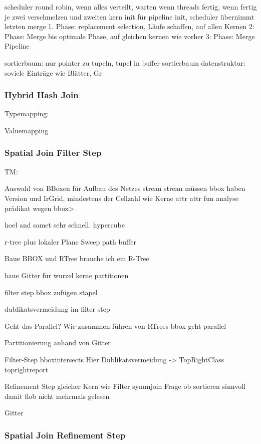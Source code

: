 \documentclass[a4paper,12pt,twoside]{article}
\begin{document}
scheduler round robin, wenn alles verteilt, warten wenn threads fertig, wenn fertig je zwei verschmelzen und zweiten kern init für pipeline init, scheduler übernimmt letzten merge
1. Phase: replacement selection, Läufe schaffen, auf allen Kernen
2: Phase: Merge bis optimale Phase, auf gleichen kernen wie vorher
3: Phase: Merge Pipeline

sortierbaum: nur pointer zu tupeln, tupel in buffer
sortierbaum datenstruktur: soviele Einträge wie Blätter, Gr


\subsubsection{Hybrid Hash Join}

Typemapping:

Valuemapping

\subsubsection{Spatial Join Filter Step}




TM:

Auswahl von BBoxen für Aufbau des Netzes
strean strean müssen bbox haben Version und IrGrid, mindestens der Cellzahl wie Kerne
attr attr fun
analyse prädikat wegen bbox>

hoel and samet sehr schnell. hypercube

r-tree plus lokaler Plane Sweep
path buffer


Baue BBOX und RTree
brauche ich ein R-Tree

baue Gitter für wurzel kerne partitionen

filter step bbox zufügen stapel

dublikatsvermeidung im filter step

Geht das Parallel? Wie zusammen führen von RTrees
bbox geht parallel

Partitionierung
anhand von Gitter

Filter-Step
bboxintersects
Hier Dublikatsvermeidung -> TopRightClass
toprightreport

Refinement Step gleicher Kern wie Filter
symmjoin
Frage ob sortieren sinnvoll damit flob nicht mehrmals gelesen

Gitter

\subsubsection{Spatial Join Refinement Step}
\end{document}
